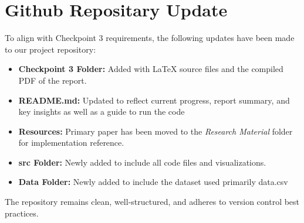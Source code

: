 \documentclass[10pt]{article}
\begin{document}



\section{Github Repositary Update}
To align with Checkpoint 3 requirements, the following updates have been made to our project repository:

\begin{itemize}[noitemsep]
    \item \textbf{Checkpoint 3 Folder:} Added with LaTeX source files and the compiled PDF of the report.
    \item \textbf{README.md:} Updated to reflect current progress, report summary, and key insights as well as a guide to run the code
    \item \textbf{Resources:} Primary paper has been moved to the \textit{Research Material} folder for implementation reference.
    \item \textbf{src Folder:} Newly added to include all code files and visualizations.
    \item \textbf{Data Folder:} Newly added to include the dataset used primarily data.csv
\end{itemize}
The repository remains clean, well-structured, and adheres to version control best practices.
\end{document}
